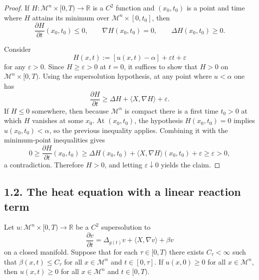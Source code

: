 \begin{proof}
\sketch If \(H : \mathcal M^n \times [0,T) \to \mathbb R\) is a \(C^2\) function and \((x_0,t_0)\) is a point and time where \(H\) attains its minimum over \(\mathcal M^n \times [0,t_0]\), then
\[
\frac{\partial H}{\partial t}(x_0,t_0) \le 0,\qquad \nabla H(x_0,t_0)=0,\qquad \Delta H(x_0,t_0)\ge 0.
\]

Consider
\[
H(x,t) := [u(x,t)-\alpha]+\varepsilon t+\varepsilon
\]
for any \(\varepsilon>0\). Since \(H\ge \varepsilon>0\) at \(t=0\), it suffices to show that \(H>0\) on \(\mathcal M^n \times [0,T)\). Using the supersolution hypothesis, at any point where \(u<\alpha\) one has
\[
\frac{\partial H}{\partial t}\ge \Delta H + \langle X,\nabla H\rangle+\varepsilon.
\]
If \(H\le 0\) somewhere, then because \(\mathcal M^n\) is compact there is a first time \(t_0>0\) at which \(H\) vanishes at some \(x_0\). At \((x_0,t_0)\), the hypothesis \(H(x_0,t_0)=0\) implies \(u(x_0,t_0)<\alpha\), so the previous inequality applies. Combining it with the minimum-point inequalities gives
\[
0\ge \frac{\partial H}{\partial t}(x_0,t_0)\ge \Delta H(x_0,t_0)+\langle X,\nabla H\rangle(x_0,t_0)+\varepsilon\ge \varepsilon>0,
\]
a contradiction. Therefore \(H>0\), and letting \(\varepsilon \downarrow 0\) yields the claim.
\end{proof}

\subsection*{1.2. The heat equation with a linear reaction term}

\begin{proposition}
\label{ch04-prop-scalar-max-principle-linear-reaction}

Let \(u : \mathcal M^n \times [0,T) \to \mathbb R\) be a \(C^2\) supersolution to
\[
\frac{\partial v}{\partial t} = \Delta_{g(t)} v + \langle X, \nabla v \rangle + \beta v
\]
on a closed manifold. Suppose that for each \(\tau \in [0,T)\) there exists \(C_\tau<\infty\) such that \(\beta(x,t)\le C_\tau\) for all \(x \in \mathcal M^n\) and \(t \in [0,\tau]\). If \(u(x,0)\ge 0\) for all \(x \in \mathcal M^n\), then \(u(x,t)\ge 0\) for all \(x \in \mathcal M^n\) and \(t \in [0,T)\).
\end{proposition}

